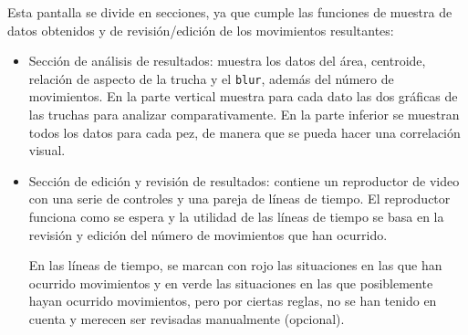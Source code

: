 Esta pantalla se divide en secciones, ya que cumple las funciones de muestra de datos obtenidos y de revisión/edición de los movimientos resultantes:
\begin{itemize}
    \item Sección de análisis de resultados: muestra los datos del área, centroide, relación de aspecto de la trucha y el \texttt{blur}, además del número de movimientos. En la parte vertical muestra para cada dato las dos gráficas 
    de las truchas para analizar comparativamente. En la parte inferior se muestran todos los datos para cada pez, de manera que se pueda hacer una correlación visual.
    \item Sección de edición y revisión de resultados: contiene un reproductor de video con una serie de controles y una pareja de líneas de tiempo. El reproductor funciona como se espera y la utilidad de las líneas de tiempo se 
    basa en la revisión y edición del número de movimientos que han ocurrido.

    En las líneas de tiempo, se marcan con rojo las situaciones en las que han ocurrido movimientos y en verde las situaciones en las que posiblemente hayan ocurrido movimientos, pero por ciertas reglas, no se han tenido en cuenta 
    y merecen ser revisadas manualmente (opcional).


\end{itemize}
